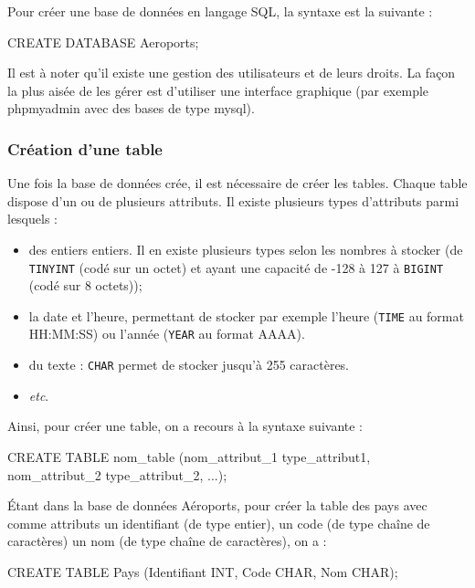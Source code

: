 \documentclass[10pt,fleqn]{article} %
\begin{document}
\begin{envsql}
Pour créer une base de données en langage SQL, la syntaxe est la suivante :

\begin{sql}
CREATE DATABASE Aeroports;
\end{sql}
\end{envsql}

Il est à noter qu'il existe une gestion des utilisateurs et de leurs droits. La façon la plus aisée de les gérer est d'utiliser une interface graphique (par exemple phpmyadmin avec des bases de type mysql).

\subsubsection{Création d'une table}
Une fois la base de données crée, il est nécessaire de créer les tables. Chaque table dispose d'un ou de plusieurs attributs. Il existe plusieurs types d'attributs parmi lesquels : 
\begin{itemize}
 \item des entiers entiers. Il en existe plusieurs types selon les nombres à stocker (de \texttt{TINYINT} (codé sur un octet) et ayant une capacité de -128 à 127 à \texttt{BIGINT} (codé sur 8 octets));
 \item la date et l'heure, permettant de stocker par exemple l'heure (\texttt{TIME} au format HH:MM:SS) ou l'année (\texttt{YEAR} au format AAAA).
 \item du texte : \texttt{CHAR} permet de stocker jusqu'à 255 caractères.
 \item \textit{etc}.
\end{itemize}

\begin{envsql}

Ainsi, pour créer une table, on a recours à la syntaxe suivante :
\begin{sql}
CREATE TABLE nom_table (nom_attribut_1 type_attribut1, nom_attribut_2  type_attribut_2, ...);
\end{sql}
\end{envsql}

\begin{exemple}
Étant dans la base de données Aéroports, pour créer la table des pays avec comme attributs un identifiant (de type entier), un code (de type chaîne de caractères) un nom (de type chaîne de caractères), on a :
\begin{envsql}
\begin{sql}
CREATE TABLE Pays (Identifiant INT, Code CHAR, Nom CHAR);
\end{sql}
\end{envsql}

\end{exemple}
\end{document}
